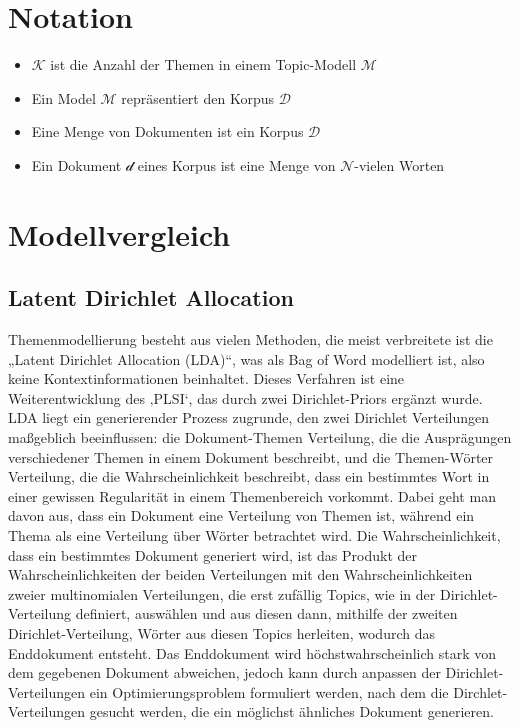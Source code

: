 \documentclass[german,version-2020-11]{uzl-thesis}
\begin{document}
\section{Notation}

\begin{itemize}
	\item $\mathcal{K}$ ist die Anzahl der Themen in einem Topic-Modell $\mathcal{M}$
	\item Ein Model $\mathcal{M}$ repräsentiert den Korpus $\mathcal{D}$
	\item Eine Menge von Dokumenten ist ein Korpus $\mathcal{D}$
	\item Ein Dokument $\mathcal{d}$ eines Korpus ist eine Menge von $\mathcal{N}$-vielen 
	Worten 
\end{itemize}


\section{Modellvergleich}
\subsection{Latent Dirichlet Allocation}
Themenmodellierung besteht aus vielen Methoden, die meist verbreitete ist die „Latent Dirichlet Allocation (LDA)“, was als Bag of Word modelliert ist, also keine Kontextinformationen beinhaltet. Dieses Verfahren ist eine Weiterentwicklung des ‚PLSI‘, das durch zwei Dirichlet-Priors ergänzt wurde. LDA liegt ein generierender Prozess zugrunde, den zwei Dirichlet Verteilungen maßgeblich beeinflussen: die Dokument-Themen Verteilung, die die Ausprägungen verschiedener Themen in einem Dokument beschreibt, und die Themen-Wörter Verteilung, die die Wahrscheinlichkeit beschreibt, dass ein bestimmtes Wort in einer gewissen Regularität in einem Themenbereich vorkommt. Dabei geht man davon aus, dass ein Dokument eine Verteilung von Themen ist, während ein Thema als eine Verteilung über Wörter betrachtet wird. 
Die Wahrscheinlichkeit, dass ein bestimmtes Dokument generiert wird, ist das Produkt der Wahrscheinlichkeiten der beiden Verteilungen mit den Wahrscheinlichkeiten zweier multinomialen Verteilungen, die erst zufällig Topics, wie in der Dirichlet-Verteilung definiert, auswählen und aus diesen dann, mithilfe der zweiten Dirichlet-Verteilung, Wörter aus diesen Topics herleiten, wodurch das Enddokument entsteht. Das Enddokument wird höchstwahrscheinlich stark von dem gegebenen Dokument abweichen, jedoch kann durch anpassen der Dirichlet-Verteilungen ein Optimierungsproblem formuliert werden, nach dem die Dirchlet-Verteilungen gesucht werden, die ein möglichst ähnliches Dokument generieren.
\end{document}
